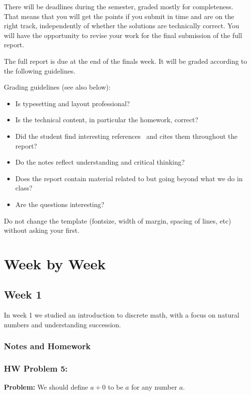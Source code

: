 \documentclass{article}
\theoremstyle{theorem}
\theoremstyle{definition}
\theoremstyle{remark}
\begin{document}
There will be deadlines during the semester, graded mostly for completeness. That means that you will get the points if you submit in time and are on the right track, independently of whether the solutions are technically correct. You will have the opportunity to revise your work for the final submission of the full report.

The full report is due at the end of the finals week. It will be graded according to the following guidelines.

Grading  guidelines (see also below):
\begin{itemize}
\item Is typesetting and layout professional? 
\item Is the technical content, in particular the homework, correct?
\item Did the student find interesting references~\cite{bla} and cites them throughout the report?
\item Do the notes reflect understanding and critical thinking?
\item Does the report contain material related to but going beyond what we do in class?
\item Are the questions interesting?
\end{itemize}

Do not change the template (fontsize, width of margin, spacing of lines, etc) without asking your first.

\section{Week by Week}\label{homework}

\subsection{Week 1}

In week 1 we studied an introduction to discrete math, with a focus on natural numbers and understanding succession. 

\subsubsection*{Notes and Homework}

\subsubsection{HW Problem 5:}

\textbf{Problem:} We should define \( a + 0 \) to be \( a \) for any number \( a \).
\end{document}
